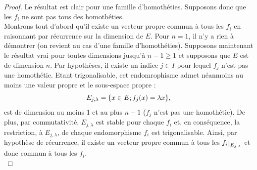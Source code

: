 \begin{proof}
Le résultat est clair pour une famille d'homothéties. Supposons donc que les $f_i$ ne sont pas tous des homothéties. \\

Montrons tout d'abord qu'il existe un vecteur propre commun à tous les $f_i$ en raisonnant par récurrence sur la dimension de $E$.
Pour $n=1$, il n'y a rien à démontrer (on revient au cas d'une famille d'homothéties). 
Supposons maintenant le résultat vrai pour toutes dimensions jusqu'à $n-1 \geq 1$ et supposons que $E$ est de dimension $n$.
Par hypothèses, il existe un indice $j \in I$ pour lequel $f_j$ n'est pas une homothétie. Etant trigonalisable, cet endomrophisme admet
néanmoins au moins une valeur propre et le sous-espace propre :
\[ E_{j, \lambda} = \{  x \in E ; f_j(x) = \lambda x  \} , \]
est de dimension au moins 1 et au plus $n-1$ ($f_j$ n'est pas une homothétie). 
De plus, par commutativité, $E_{j, \lambda}$ est stable pour chaque $f_i$ et, en conséquence, la restriction, à $E_{j, \lambda}$,
de chaque endomorphisme $f_i$ est trigonalisable. 
Ainsi, par hypothèse de récurrence, il existe un vecteur propre commun à tous les $\restr{f_i}{E_{j, \lambda}}$ et donc commun à tous
les $f_i$. \\


\end{proof}

